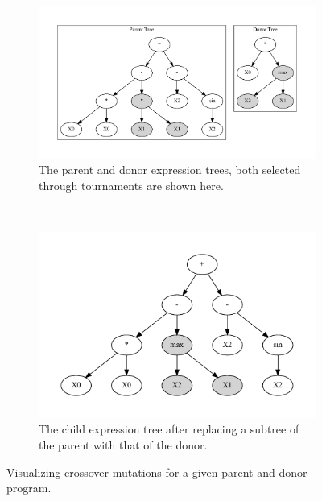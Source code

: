 \begin{figure}[htp]
  \centering
  \begin{subfigure}{\textwidth}
    \raggedleft
    \includegraphics[scale=0.75]{images/graphviz/crossover_before.dot.pdf}
    \caption{The parent and donor expression trees, both selected through tournaments are shown here.}
    \label{fig:crossover_muta}
  \end{subfigure}%
  \\
  \begin{subfigure}{\textwidth}
    \centering
    \includegraphics[scale=0.75]{images/graphviz/crossover_after.dot.pdf}
    \caption{The child expression tree after replacing a subtree of the parent with that of the donor.}
    \label{fig:crossover_mutb}
  \end{subfigure}
  \caption{Visualizing crossover mutations for a given parent and donor program.}
  
  \label{fig:crossover}
\end{figure}

